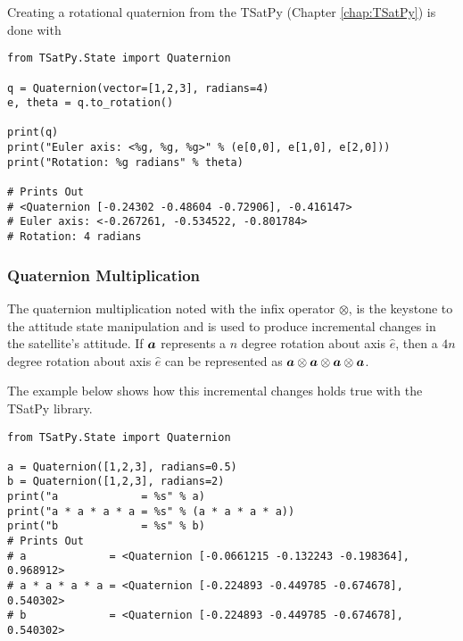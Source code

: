 Creating a rotational quaternion from the TSatPy (Chapter \ref{chap:TSatPy}) is done with

\begin{singlespace}
  \begin{verbatim}
from TSatPy.State import Quaternion

q = Quaternion(vector=[1,2,3], radians=4)
e, theta = q.to_rotation()

print(q)
print("Euler axis: <%g, %g, %g>" % (e[0,0], e[1,0], e[2,0]))
print("Rotation: %g radians" % theta)

# Prints Out
# <Quaternion [-0.24302 -0.48604 -0.72906], -0.416147>
# Euler axis: <-0.267261, -0.534522, -0.801784>
# Rotation: 4 radians
  \end{verbatim}
  \nocite{minted}
\end{singlespace}








\subsubsection{Quaternion Multiplication}
\label{subsubsec:QuaternionMultiplication}

The quaternion multiplication noted with the infix operator $\otimes$, is the keystone to the attitude state manipulation and is used to produce incremental changes in the satellite's attitude.  If $\boldsymbol{a}$ represents a $n$ degree rotation about axis $\hat{e}$, then a $4n$ degree rotation about axis $\hat{e}$ can be represented as $\boldsymbol{a} \otimes \boldsymbol{a} \otimes \boldsymbol{a} \otimes \boldsymbol{a}$.

The example below shows how this incremental changes holds true with the TSatPy library.

\begin{singlespace}
  \begin{verbatim}
from TSatPy.State import Quaternion

a = Quaternion([1,2,3], radians=0.5)
b = Quaternion([1,2,3], radians=2)
print("a             = %s" % a)
print("a * a * a * a = %s" % (a * a * a * a))
print("b             = %s" % b)
# Prints Out
# a             = <Quaternion [-0.0661215 -0.132243 -0.198364], 0.968912>
# a * a * a * a = <Quaternion [-0.224893 -0.449785 -0.674678], 0.540302>
# b             = <Quaternion [-0.224893 -0.449785 -0.674678], 0.540302>
  \end{verbatim}
  \nocite{minted}
\end{singlespace}

